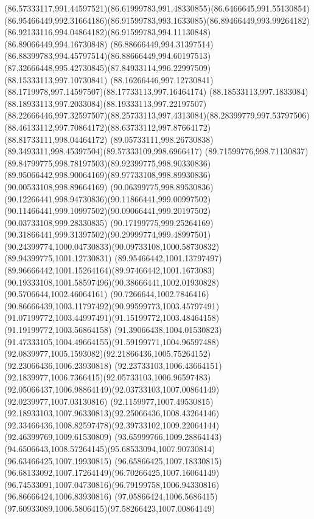 {{\curveto(86.57333117,991.44597521)(86.61999783,991.48330855)(86.6466645,991.55130854)
\curveto(86.95466449,992.31664186)(86.91599783,993.1633085)(86.89466449,993.99264182)
\curveto(86.92133116,994.04864182)(86.91599783,994.11130848)(86.89066449,994.16730848)
\curveto(86.88666449,994.31397514)(86.88399783,994.45797514)(86.88666449,994.60197513)
\curveto(87.32666448,995.42730845)(87.84933114,996.22997509)(88.15333113,997.10730841)
\curveto(88.16266446,997.12730841)(88.1719978,997.14597507)(88.17733113,997.16464174)
\curveto(88.18533113,997.1833084)(88.18933113,997.2033084)(88.19333113,997.22197507)
\curveto(88.22666446,997.32597507)(88.25733113,997.4313084)(88.28399779,997.53797506)
\curveto(88.46133112,997.70864172)(88.63733112,997.87664172)(88.81733111,998.04464172)
\curveto(89.05733111,998.26730838)(89.3493311,998.45397504)(89.57333109,998.6966417)
\curveto(89.71599776,998.71130837)(89.84799775,998.78197503)(89.92399775,998.90330836)
\curveto(89.95066442,998.90064169)(89.97733108,998.89930836)(90.00533108,998.89664169)
\curveto(90.06399775,998.89530836)(90.12266441,998.94730836)(90.11866441,999.00997502)
\curveto(90.11466441,999.10997502)(90.09066441,999.20197502)(90.03733108,999.28330835)
\curveto(90.17199775,999.25264169)(90.31866441,999.31397502)(90.29999774,999.48997501)
\curveto(90.24399774,1000.04730833)(90.09733108,1000.58730832)(89.94399775,1001.12730831)
\curveto(89.95466442,1001.13797497)(89.96666442,1001.15264164)(89.97466442,1001.1673083)
\curveto(90.19333108,1001.58597496)(90.38666441,1002.01930828)(90.5706644,1002.46064161)
\curveto(90.7266644,1002.7846416)(90.86666439,1003.11797492)(90.99599773,1003.45797491)
\curveto(91.07199772,1003.44997491)(91.15199772,1003.48464158)(91.19199772,1003.56864158)
\curveto(91.39066438,1004.01530823)(91.47333105,1004.49664155)(91.59199771,1004.96597488)
\curveto(92.0839977,1005.1593082)(92.21866436,1005.75264152)(92.23066436,1006.23930818)
\curveto(92.23733103,1006.43664151)(92.1839977,1006.7366415)(92.05733103,1006.96597483)
\curveto(92.05066437,1006.98864149)(92.03733103,1007.00864149)(92.0239977,1007.03130816)
\curveto(92.1159977,1007.49530815)(92.18933103,1007.96330813)(92.25066436,1008.43264146)
\curveto(92.33466436,1008.82597478)(92.39733102,1009.22064144)(92.46399769,1009.61530809)
\lineto(93.65999766,1009.28864143)
\curveto(94.6506643,1008.57264145)(95.68533094,1007.90730814)(96.63466425,1007.19930815)
\curveto(96.65866425,1007.18330815)(96.68133092,1007.17264149)(96.70266425,1007.16064149)
\curveto(96.74533091,1007.04730816)(96.79199758,1006.94330816)(96.86666424,1006.83930816)
\curveto(97.05866424,1006.5686415)(97.60933089,1006.5806415)(97.58266423,1007.00864149)
}}
